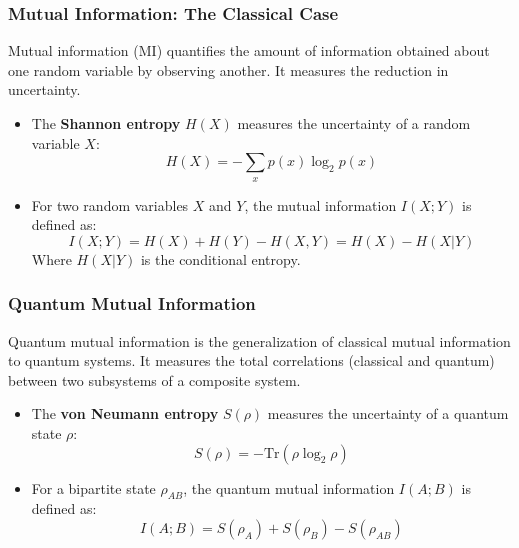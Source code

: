 \begin{frame}
    \frametitle{Mutual Information: The Classical Case}

    Mutual information (MI) quantifies the amount of information obtained about one random variable by observing another. It measures the reduction in uncertainty.

    \vspace{0.2cm}

    \begin{itemize}
        \item The \textbf{Shannon entropy} $H(X)$ measures the uncertainty of a random variable $X$:
              \begin{equation*}
                  H(X) = - \sum_x p(x) \log_2 p(x)
              \end{equation*}

        \item For two random variables $X$ and $Y$, the mutual information $I(X; Y)$ is defined as:
              \begin{equation*}
                  I(X; Y) = H(X) + H(Y) - H(X, Y) = H(X) - H(X|Y)
              \end{equation*}
              Where $H(X|Y)$ is the conditional entropy.
    \end{itemize}

\end{frame}

\begin{frame}
    \frametitle{Quantum Mutual Information}

    Quantum mutual information is the generalization of classical mutual information to quantum systems. It measures the total correlations (classical and quantum) between two subsystems of a composite system.

    \vspace{0.2cm}

    \begin{itemize}
        \item The \textbf{von Neumann entropy} $S(\rho)$ measures the uncertainty of a quantum state $\rho$:
              \begin{equation*}
                  S(\rho) = - \text{Tr}(\rho \log_2 \rho)
              \end{equation*}

        \item For a bipartite state $\rho_{AB}$, the quantum mutual information $I(A; B)$ is defined as:
              \begin{equation*}
                  I(A; B) = S(\rho_A) + S(\rho_B) - S(\rho_{AB})
              \end{equation*}
    \end{itemize}

\end{frame}

